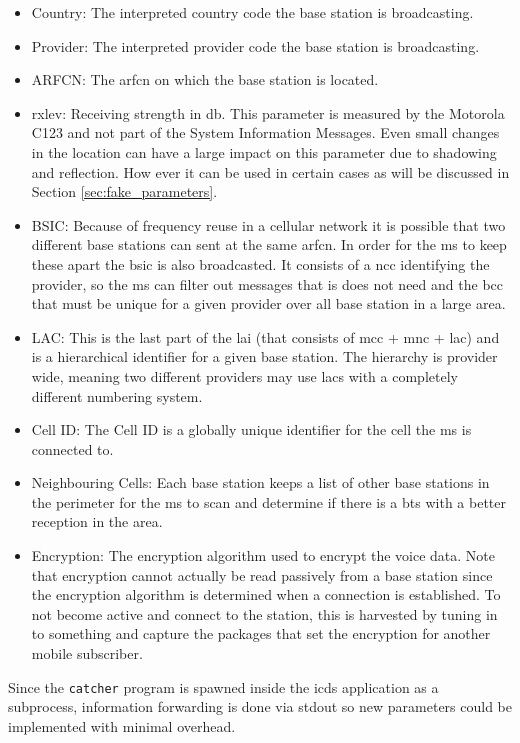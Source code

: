 \begin{itemize}
	\item Country: The interpreted country code the base station is broadcasting.
	\item Provider: The interpreted provider code the base station is broadcasting.
	\item ARFCN: The \gls{arfcn} on which the base station is located.
	\item rxlev: Receiving strength in db.
	This parameter is measured by the Motorola C123 and not part of the System Information Messages.
	Even small changes in the location can have a large impact on this parameter due to shadowing and reflection.
	How ever it can be used in certain cases as will be discussed in Section \ref{sec:fake_parameters}.
	\item BSIC: Because of frequency reuse in a cellular network it is possible that two different base stations can sent at the same \gls{arfcn}.
	In order for the \gls{ms} to keep these apart the \gls{bsic} is also broadcasted.
	It consists of a \gls{ncc} identifying the provider, so the \gls{ms} can filter out messages that is does not need and the \gls{bcc} that must be unique for a given provider over all base station in a large area.
	\item LAC: This is the last part of the \gls{lai} (that consists of \gls{mcc} + \gls{mnc} + \gls{lac}) and is a hierarchical identifier for a given base station.
	The hierarchy is provider wide, meaning two different providers may use \glspl{lac} with a completely different numbering system.
	\item Cell ID: The Cell ID is a globally unique identifier for the cell the \gls{ms} is connected to.
	\item Neighbouring Cells: Each base station keeps a list of other base stations in the perimeter  for the \gls{ms} to scan and determine if there is a \gls{bts} with a better reception in the area.
	\item Encryption: The encryption algorithm used to encrypt the voice data.
	Note that encryption cannot actually be read passively from a base station since the encryption algorithm is determined when a connection is established.
	To not become active and connect to the station, this is harvested by tuning in to something and capture the packages that set the encryption for another mobile subscriber.
\end{itemize}
Since the \texttt{catcher} program is spawned inside the \gls{icds} application as a subprocess, information forwarding is done via stdout so new parameters could be implemented with minimal overhead.

